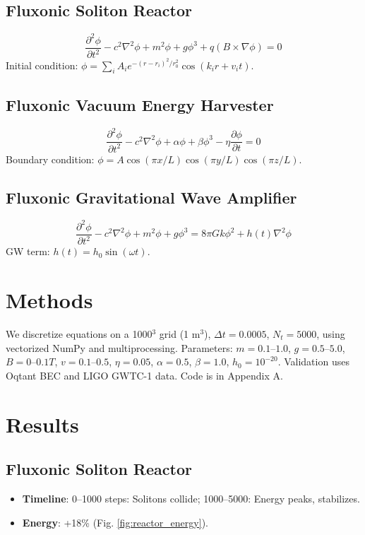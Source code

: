 \documentclass[11pt]{article}
\begin{document}
\subsection{Fluxonic Soliton Reactor}
\begin{equation}
\frac{\partial^2 \phi}{\partial t^2} - c^2 \nabla^2 \phi + m^2 \phi + g \phi^3 + q (B \times \nabla \phi) = 0
\end{equation}
Initial condition: \(\phi = \sum_i A_i e^{-(r-r_i)^2/r_0^2} \cos(k_i r + v_i t)\).

\subsection{Fluxonic Vacuum Energy Harvester}
\begin{equation}
\frac{\partial^2 \phi}{\partial t^2} - c^2 \nabla^2 \phi + \alpha \phi + \beta \phi^3 - \eta \frac{\partial \phi}{\partial t} = 0
\end{equation}
Boundary condition: \(\phi = A \cos(\pi x/L) \cos(\pi y/L) \cos(\pi z/L)\).

\subsection{Fluxonic Gravitational Wave Amplifier}
\begin{equation}
\frac{\partial^2 \phi}{\partial t^2} - c^2 \nabla^2 \phi + m^2 \phi + g \phi^3 = 8\pi G k \phi^2 + h(t) \nabla^2 \phi
\end{equation}
GW term: \(h(t) = h_0 \sin(\omega t)\).

\section{Methods}
We discretize equations on a 1000$^3$ grid (1 m$^3$), \(\Delta t = 0.0005\), \(N_t = 5000\), using vectorized NumPy and multiprocessing. Parameters: \(m = 0.1–1.0\), \(g = 0.5–5.0\), \(B = 0–0.1 T\), \(v = 0.1–0.5\), \(\eta = 0.05\), \(\alpha = 0.5\), \(\beta = 1.0\), \(h_0 = 10^{-20}\). Validation uses Oqtant BEC and LIGO GWTC-1 data. Code is in Appendix A.

\section{Results}
\subsection{Fluxonic Soliton Reactor}
\begin{itemize}
    \item \textbf{Timeline}: 0--1000 steps: Solitons collide; 1000--5000: Energy peaks, stabilizes.
    \item \textbf{Energy}: +18\% (Fig. \ref{fig:reactor_energy}).
\end{itemize}
\end{document}
